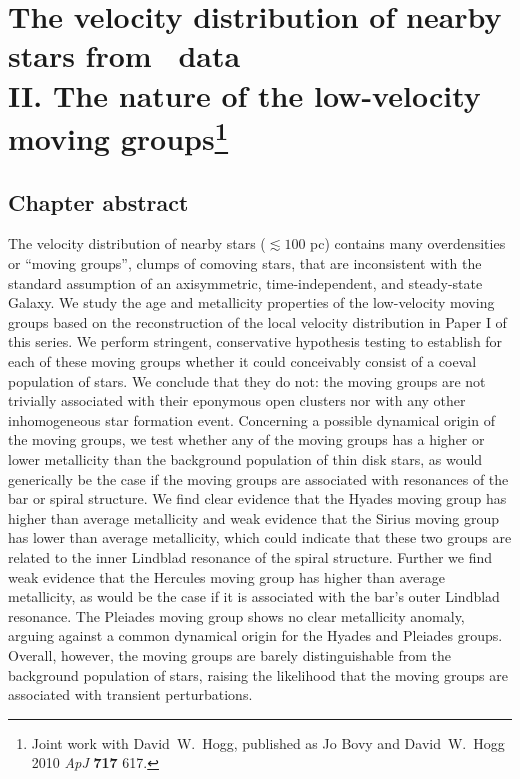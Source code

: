 
\chapter[The velocity distribution of nearby stars from \Hipparcos\ data II. The nature of the low-velocity moving groups]{The velocity distribution of nearby stars from \Hipparcos\ data\\
II. The nature of the low-velocity moving
groups\protect\footnote{Joint work with David~W.~Hogg, published as Jo Bovy and David~W.~Hogg 2010 \emph{ApJ} {\bf 717} 617.}}

\section{Chapter abstract}
The velocity distribution of nearby stars ($\lesssim 100$ pc) contains
many overdensities or ``moving groups'', clumps of comoving stars,
that are inconsistent with the standard assumption of an axisymmetric,
time-independent, and steady-state Galaxy. We study the age and
metallicity properties of the low-velocity moving groups based on the
reconstruction of the local velocity distribution in Paper I of this
series. We perform stringent, conservative hypothesis testing to
establish for each of these moving groups whether it could conceivably
consist of a coeval population of stars. We conclude that they do not:
the moving groups are not trivially associated with their eponymous
open clusters nor with any other inhomogeneous star formation
event. Concerning a possible dynamical origin of the moving groups, we
test whether any of the moving groups has a higher or lower
metallicity than the background population of thin disk stars, as
would generically be the case if the moving groups are associated with
resonances of the bar or spiral structure. We find clear evidence that
the Hyades moving group has higher than average metallicity and weak
evidence that the Sirius moving group has lower than average
metallicity, which could indicate that these two groups are related to
the inner Lindblad resonance of the spiral structure. Further we find
weak evidence that the Hercules moving group has higher than average
metallicity, as would be the case if it is associated with the bar's
outer Lindblad resonance. The Pleiades moving group shows no clear
metallicity anomaly, arguing against a common dynamical origin for the
Hyades and Pleiades groups. Overall, however, the moving groups are
barely distinguishable from the background population of stars,
raising the likelihood that the moving groups are associated with
transient perturbations.



